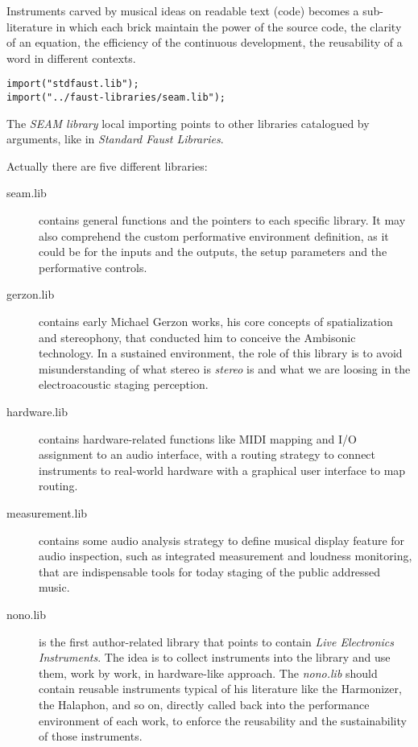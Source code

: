 \documentclass[twoside,a4paper]{article}
\begin{document}
Instruments carved by musical ideas on readable text (code) becomes a
sub-literature in which each brick maintain the power of the source code, the
clarity of an equation, the efficiency of the continuous development, the
reusability of a word in different contexts.

\begin{lstlisting}
import("stdfaust.lib");
import("../faust-libraries/seam.lib");
\end{lstlisting}

The \emph{SEAM library} local importing points to other libraries catalogued by
arguments, like in \emph{Standard Faust Libraries}.

Actually there are five different libraries:
\begin{description}
  \item[seam.lib] contains general functions and the pointers to each specific
  library. It may also comprehend the custom performative environment definition,
  as it could be for the inputs and the outputs, the setup parameters and the
  performative controls.
  \item[gerzon.lib] contains early Michael Gerzon works, his core concepts of
  spatialization and stereophony, that conducted him to conceive the Ambisonic
  technology. In a sustained environment, the role of this library is to avoid
  misunderstanding of what stereo is \emph{stereo} is \cite{ab58} and what we
  are loosing in the electroacoustic staging perception.
  \item[hardware.lib] contains hardware-related functions like MIDI mapping and
  I/O assignment to an audio interface, with a routing strategy to connect
  instruments to real-world hardware with a graphical user interface to map
  routing.
  \item[measurement.lib] contains some audio analysis strategy to define musical
  display feature for audio inspection, such as integrated measurement and
  loudness monitoring, that are indispensable tools for today staging of the
  public addressed music.
  \item[nono.lib] is the first author-related library that points to contain
  \emph{Live Electronics Instruments}. The idea is to collect instruments into
  the library and use them, work by work, in hardware-like approach. The
  \emph{nono.lib} should contain reusable instruments typical of his literature
  like the Harmonizer, the Halaphon, and so on, directly called back into the
  performance environment of each work, to enforce the reusability and the
  sustainability of those instruments.
\end{description}
\end{document}
